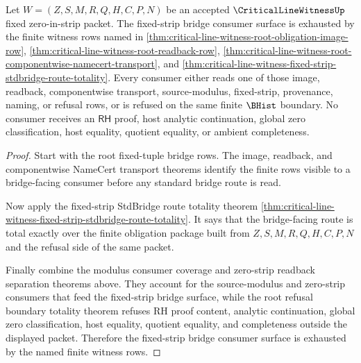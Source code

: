 \begin{theorem}
\label{thm:critical-line-witness-fixed-strip-bridge-consumer-totality}
Let $W=(Z,S,M,R,Q,H,C,P,N)$ be an accepted $\CriticalLineWitnessUp$ fixed zero-in-strip packet. The fixed-strip bridge consumer surface is exhausted by the finite witness rows named in \autoref{thm:critical-line-witness-root-obligation-image-row}, \autoref{thm:critical-line-witness-root-readback-row}, \autoref{thm:critical-line-witness-root-componentwise-namecert-transport}, and \autoref{thm:critical-line-witness-fixed-strip-stdbridge-route-totality}. Every consumer either reads one of those image, readback, componentwise transport, source-modulus, fixed-strip, provenance, naming, or refusal rows, or is refused on the same finite $\BHist$ boundary. No consumer receives an $\mathsf{RH}$ proof, host analytic continuation, global zero classification, host equality, quotient equality, or ambient completeness.
\end{theorem}
\begin{proof}
Start with the root fixed-tuple bridge rows. The image, readback, and componentwise NameCert transport theorems identify the finite rows visible to a bridge-facing consumer before any standard bridge route is read.

Now apply the fixed-strip StdBridge route totality theorem \autoref{thm:critical-line-witness-fixed-strip-stdbridge-route-totality}. It says that the bridge-facing route is total exactly over the finite obligation package built from $Z,S,M,R,Q,H,C,P,N$ and the refusal side of the same packet.

Finally combine the modulus consumer coverage and zero-strip readback separation theorems above. They account for the source-modulus and zero-strip consumers that feed the fixed-strip bridge surface, while the root refusal boundary totality theorem refuses RH proof content, analytic continuation, global zero classification, host equality, quotient equality, and completeness outside the displayed packet. Therefore the fixed-strip bridge consumer surface is exhausted by the named finite witness rows.
\end{proof}
